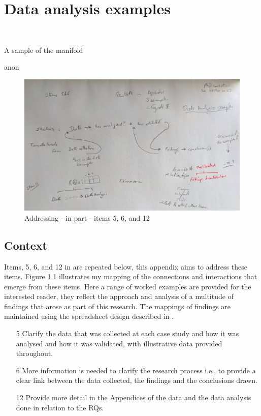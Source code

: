 \chapter{Data analysis examples}~\label{appendix-data-analysis-examples}

\epigraph{A sample of the manifold}{anon}

\begin{figure}
    \centering
    \includegraphics[width=\textwidth]{images/rough-sketches/worked-examples-in-context.jpg}
    \caption{Addressing - in part - items 5, 6, and 12}
    \label{fig:worked-examples-in-context}
\end{figure}

\section*{Context}
Items, 5, 6, and 12 in  are repeated below, this appendix aims to address these items. Figure \ref{fig:worked-examples-in-context} illustrates my mapping of the connections and interactions that emerge from these items. Here a range of worked examples are provided for the interested reader, they reflect the approach and analysis of a multitude of findings that arose as part of this research. The mappings of findings are maintained using the spreadsheet design described in .

\begin{enumerate}
    \item[5] Clarify the data that was collected at each case study and how it was analysed and how it was validated, with illustrative data provided throughout.
    \item[6] More information is needed to clarify the research process i.e., to provide a clear link between the data collected, the findings and the conclusions drawn.
    \item[12] Provide more detail in the Appendices of the data and the data analysis done in relation to the RQs.
\end{enumerate}

